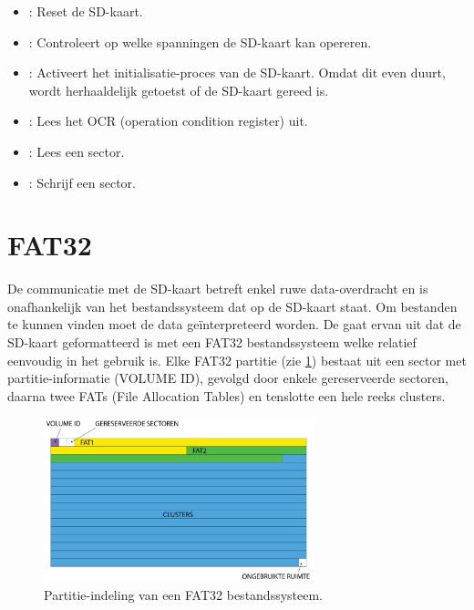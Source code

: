 \begin{itemize}
    \item {}: Reset de SD-kaart. 
    \item {}: Controleert op welke spanningen de SD-kaart kan opereren. 
    \item {}: Activeert het initialisatie-proces van de SD-kaart. Omdat dit even duurt, wordt herhaaldelijk getoetst of de SD-kaart gereed is. 
    \item {}: Lees het OCR (operation condition register) uit. 
    \item {}: Lees een sector. 
    \item {}: Schrijf een sector. 
\end{itemize}

%
%
%
\section{FAT32}


De communicatie met de SD-kaart betreft enkel ruwe data-overdracht en is onafhankelijk van het bestandssysteem dat op de SD-kaart staat. Om bestanden te kunnen vinden moet de data geïnterpreteerd worden. De \product gaat ervan uit dat de SD-kaart geformatteerd is met een FAT32 bestandssysteem welke relatief eenvoudig in het gebruik is. Elke FAT32 partitie (zie \cref{fig:fat32-partition}) bestaat uit een sector met partitie-informatie (VOLUME ID), gevolgd door enkele gereserveerde sectoren, daarna twee FATs (File Allocation Tables) en tenslotte een hele reeks clusters.

\begin{figure}[h!]
    \centering
    \includegraphics[width=0.70\textwidth]{img/fat32-partitie.png}
    \caption{Partitie-indeling van een FAT32 bestandssysteem.}
    \label{fig:fat32-partition}
\end{figure}

